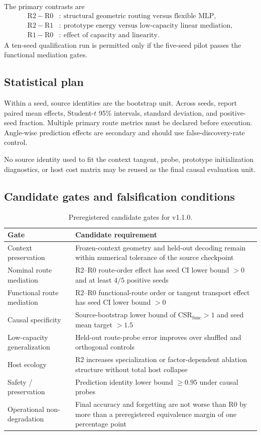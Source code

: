 \documentclass[11pt,a4paper]{article}
\begin{document}
The primary contrasts are
\begin{align}
 \mathrm{R2}-\mathrm{R0}&:\ \text{structural geometric routing versus flexible MLP},\\
 \mathrm{R2}-\mathrm{R1}&:\ \text{prototype energy versus low-capacity linear mediation},\\
 \mathrm{R1}-\mathrm{R0}&:\ \text{effect of capacity and linearity}.
\end{align}
A ten-seed qualification run is permitted only if the five-seed pilot passes the functional mediation gates.

\subsection{Statistical plan}

Within a seed, source identities are the bootstrap unit. Across seeds, report paired mean effects, Student-$t$ 95\% intervals, standard deviation, and positive-seed fraction. Multiple primary route metrics must be declared before execution. Angle-wise prediction effects are secondary and should use false-discovery-rate control.

No source identity used to fit the context tangent, probe, prototype initialization diagnostics, or host cost matrix may be reused as the final causal evaluation unit.

\subsection{Candidate gates and falsification conditions}

\begin{table}[H]
\centering
\caption{Preregistered candidate gates for v1.1.0.}
\begin{tabularx}{\textwidth}{@{}Y Y@{}}
\toprule
Gate & Candidate requirement\\
\midrule
Context preservation & Frozen-context geometry and held-out decoding remain within numerical tolerance of the source checkpoint\\
Nominal route mediation & R2--R0 route-order effect has seed CI lower bound $>0$ and at least $4/5$ positive seeds\\
Functional route mediation & R2--R0 functional-route order or tangent transport effect has seed CI lower bound $>0$\\
Causal specificity & Source-bootstrap lower bound of $\mathrm{CSR}_{\mathrm{func}}>1$ and seed mean target $>1.5$\\
Low-capacity generalization & Held-out route-probe error improves over shuffled and orthogonal controls\\
Host ecology & R2 increases specialization or factor-dependent ablation structure without total host collapse\\
Safety / preservation & Prediction identity lower bound $\geq0.95$ under causal probes\\
Operational non-degradation & Final accuracy and forgetting are not worse than R0 by more than a preregistered equivalence margin of one percentage point\\
\bottomrule
\end{tabularx}
\end{table}
\end{document}
